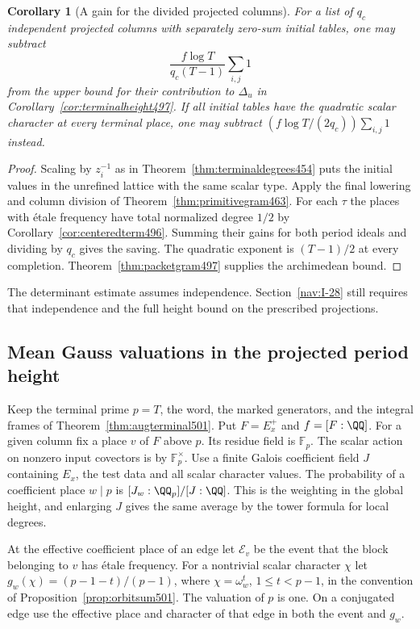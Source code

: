 \documentclass[a4paper,11pt]{article}
\newtheorem{corollary}[proposition]{Corollary}
\theoremstyle{definition}
\theoremstyle{remark}
\numberwithin{equation}{section}
\begin{document}
\begin{corollary}[A gain for the divided projected columns]\leavevmode
\label{cor:augheight501}
For a list of \(q_c\) independent projected columns with
separately zero-sum initial tables, one may subtract
\[
            \frac{f\log T}{q_c(T-1)}\sum_{i,j}1
\]
from the upper bound for their contribution to \(\Delta_u\)
in Corollary~\ref{cor:terminalheight497}. If all initial
tables have the quadratic scalar character at every terminal
place, one may subtract \((f\log T/(2q_c))\sum_{i,j}1\)
instead.
\end{corollary}
\begin{proof}
Scaling by \(z_i^{-1}\) as in Theorem~\ref{thm:terminaldegrees454}
puts the initial values in the unrefined lattice with the same
scalar type. Apply the final lowering and column division of
Theorem~\ref{thm:primitivegram463}. For each \(\tau\) the places
with \'etale frequency have total normalized degree \(1/2\)
by Corollary~\ref{cor:centeredterm496}. Summing their gains for
both period ideals and dividing by \(q_c\) gives the saving.
The quadratic exponent is \((T-1)/2\) at every completion.
Theorem~\ref{thm:packetgram497} supplies the archimedean bound.
\end{proof}
The determinant estimate assumes independence. Section~\ref{nav:I-28}
still requires that independence and the full height bound on
the prescribed projections.


\subsection{Mean Gauss valuations in the projected period height}
\label{sec:meangauss504}

Keep the terminal prime \(p=T\), the word, the marked generators,
and the integral frames of Theorem~\ref{thm:augterminal501}.
Put \(F=E_x^+\) and \(f=[F:\QQ]\). For a given column fix a place
\(v\) of \(F\) above \(p\). Its residue field is \(\mathbb F_p\).
The scalar action on nonzero input covectors is by
\(\mathbb F_p^\times\). Use a finite Galois coefficient field \(J\)
containing \(E_x\), the test data and all scalar character values.
The probability of a coefficient place \(w\mid p\) is
\([J_w:\QQ_p]/[J:\QQ]\). This is the weighting in the global
height, and enlarging \(J\) gives the same average by the tower
formula for local degrees.

At the effective coefficient place of an edge let
\(\mathcal E_v\) be the event that the block belonging to \(v\)
has \'etale frequency. For a nontrivial scalar character \(\chi\)
let \(g_w(\chi)=(p-1-t)/(p-1)\), where \(\chi=\omega_w^t\),
\(1\le t<p-1\), in the convention of
Proposition~\ref{prop:orbitsum501}. The valuation of \(p\) is one.
On a conjugated edge use the effective place and character of
that edge in both the event and \(g_w\).
\end{document}
